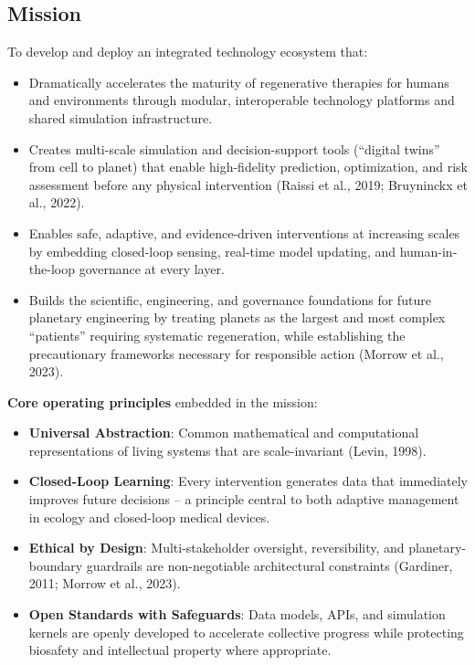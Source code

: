 \documentclass[11pt,a4paper]{article}
\begin{document}
\subsection{Mission}

To develop and deploy an integrated technology ecosystem that:

\begin{itemize}
    \item Dramatically accelerates the maturity of regenerative therapies for humans and environments through modular, interoperable technology platforms and shared simulation infrastructure.
    \item Creates multi-scale simulation and decision-support tools (``digital twins'' from cell to planet) that enable high-fidelity prediction, optimization, and risk assessment before any physical intervention (Raissi et al., 2019; Bruyninckx et al., 2022).
    \item Enables safe, adaptive, and evidence-driven interventions at increasing scales by embedding closed-loop sensing, real-time model updating, and human-in-the-loop governance at every layer.
    \item Builds the scientific, engineering, and governance foundations for future planetary engineering by treating planets as the largest and most complex ``patients'' requiring systematic regeneration, while establishing the precautionary frameworks necessary for responsible action (Morrow et al., 2023).
\end{itemize}

\textbf{Core operating principles} embedded in the mission:

\begin{itemize}
    \item \textbf{Universal Abstraction}: Common mathematical and computational representations of living systems that are scale-invariant (Levin, 1998).
    \item \textbf{Closed-Loop Learning}: Every intervention generates data that immediately improves future decisions -- a principle central to both adaptive management in ecology and closed-loop medical devices.
    \item \textbf{Ethical by Design}: Multi-stakeholder oversight, reversibility, and planetary-boundary guardrails are non-negotiable architectural constraints (Gardiner, 2011; Morrow et al., 2023).
    \item \textbf{Open Standards with Safeguards}: Data models, APIs, and simulation kernels are openly developed to accelerate collective progress while protecting biosafety and intellectual property where appropriate.
\end{itemize}
\end{document}

